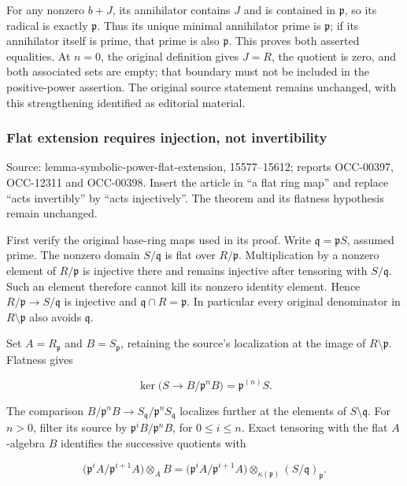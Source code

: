 For any nonzero \(b+J\), its annihilator contains \(J\) and is contained in \(\mathfrak p\), so its radical is exactly \(\mathfrak p\). Thus its unique minimal annihilator prime is \(\mathfrak p\); if its annihilator itself is prime, that prime is also \(\mathfrak p\). This proves both asserted equalities. At \(n=0\), the original definition gives \(J=R\), the quotient is zero, and both associated sets are empty; that boundary must not be included in the positive-power assertion. The original source statement remains unchanged, with this strengthening identified as editorial material.

\subsubsection{Flat extension requires injection, not invertibility}\label{algebra-proof-005-flat-extension-requires-injection-not-invertibility}

Source: lemma-symbolic-power-flat-extension, 15577--15612; reports OCC-00397, OCC-12311 and OCC-00398. Insert the article in ``a flat ring map'' and replace ``acts invertibly'' by ``acts injectively''. The theorem and its flatness hypothesis remain unchanged.

First verify the original base-ring maps used in its proof. Write \(\mathfrak q=\mathfrak pS\), assumed prime. The nonzero domain \(S/\mathfrak q\) is flat over \(R/\mathfrak p\). Multiplication by a nonzero element of \(R/\mathfrak p\) is injective there and remains injective after tensoring with \(S/\mathfrak q\). Such an element therefore cannot kill its nonzero identity element. Hence \(R/\mathfrak p\to S/\mathfrak q\) is injective and \(\mathfrak q\cap R=\mathfrak p\). In particular every original denominator in \(R\setminus\mathfrak p\) also avoids \(\mathfrak q\).

Set \(A=R_{\mathfrak p}\) and \(B=S_{\mathfrak p}\), retaining the source's localization at the image of \(R\setminus\mathfrak p\). Flatness gives

\[
\ker\bigl(S\to B/\mathfrak p^nB\bigr)=\mathfrak p^{(n)}S.
\]

The comparison \(B/\mathfrak p^nB\to S_{\mathfrak q}/\mathfrak p^nS_{\mathfrak q}\) localizes further at the elements of \(S\setminus\mathfrak q\). For \(n>0\), filter its source by \(\mathfrak p^iB/\mathfrak p^nB\), for \(0\leq i\leq n\). Exact tensoring with the flat \(A\)-algebra \(B\) identifies the successive quotients with

\[
\bigl(\mathfrak p^iA/\mathfrak p^{i+1}A\bigr)\otimes_A B
=\bigl(\mathfrak p^iA/\mathfrak p^{i+1}A\bigr)
 \otimes_{\kappa(\mathfrak p)}(S/\mathfrak q)_{\mathfrak p}.
\]

